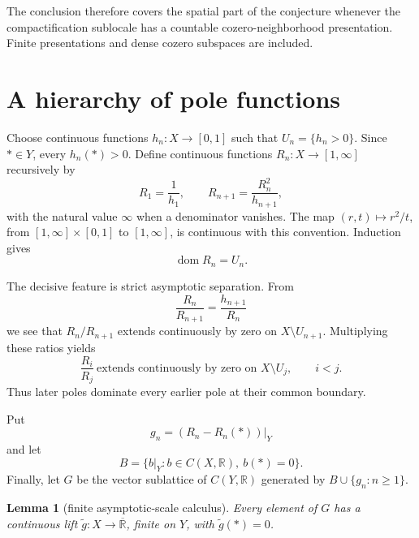 \documentclass[11pt]{article}
\newtheorem{lemma}{Lemma}
\newcommand{\R}{\mathbb{R}}
\newcommand{\eR}{\overline{\mathbb{R}}}
\begin{document}
The conclusion therefore covers the spatial part of the conjecture whenever
the compactification sublocale has a countable cozero-neighborhood
presentation.  Finite presentations and dense cozero subspaces are included.

\section{A hierarchy of pole functions}

Choose continuous functions \(h_n:X\to[0,1]\) such that
\(U_n=\{h_n>0\}\).  Since \(*\in Y\), every \(h_n(*)>0\).  Define continuous
functions \(R_n:X\to[1,\infty]\) recursively by
\begin{equation}\label{eq:poles}
 R_1=\frac1{h_1},
 \qquad
 R_{n+1}=\frac{R_n^2}{h_{n+1}},
\end{equation}
with the natural value \(\infty\) when a denominator vanishes.  The map
\((r,t)\mapsto r^2/t\), from \([1,\infty]\times[0,1]\) to
\([1,\infty]\), is continuous with this convention.  Induction gives
\[
 \operatorname{dom}R_n=U_n.
\]

The decisive feature is strict asymptotic separation.  From
\[
 \frac{R_n}{R_{n+1}}=\frac{h_{n+1}}{R_n}
\]
we see that \(R_n/R_{n+1}\) extends continuously by zero on
\(X\setminus U_{n+1}\).  Multiplying these ratios yields
\begin{equation}\label{eq:ratio}
 \frac{R_i}{R_j}\ \text{extends continuously by zero on }X\setminus U_j,
 \qquad i<j.
\end{equation}
Thus later poles dominate every earlier pole at their common boundary.

Put
\[
 g_n=(R_n-R_n(*))|_Y
\]
and let
\[
 B=\{b|_Y:b\in C(X,\R),\ b(*)=0\}.
\]
Finally, let \(G\) be the vector sublattice of \(C(Y,\R)\) generated by
\(B\cup\{g_n:n\geq1\}\).

\begin{lemma}[finite asymptotic-scale calculus]\label{lem:scale}
Every element of \(G\) has a continuous lift
\(\widetilde g:X\to\eR\), finite on \(Y\), with
\(\widetilde g(*)=0\).
\end{lemma}
\end{document}
